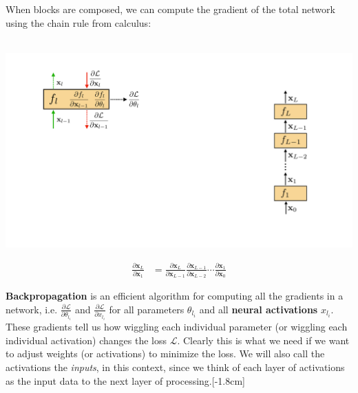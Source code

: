 When blocks are composed, we can compute the gradient of the total network using the chain rule from calculus:\\
\\
  \hspace*{0.10\linewidth}\begin{minipage}{.10\textwidth}
    \centering
    \includegraphics[width=1.0\linewidth]{./figures/backpropagation/composed_modules.pdf}
    \label{backpropagation:composed_modules}
  \end{minipage}
  \begin{minipage}{0.80\textwidth}
    \begin{align}
        \frac{\partial \mathbf{x}_{L}}{\partial \mathbf{x}_{1}} &= \frac{\partial \mathbf{x}_{L}}{\partial \mathbf{x}_{L-1}}\frac{\partial \mathbf{x}_{L-1}}{\partial \mathbf{x}_{L-2}} \cdots \frac{\partial \mathbf{x}_{1}}{\partial \mathbf{x}_{0}}\label{backprop:chain_rule}%
    \end{align}
  \end{minipage}

{\bf Backpropagation} is an efficient algorithm for computing all the gradients in a network, i.e. $\frac{\partial \mathcal{L}}{\partial \theta_{l_i}}$ and $\frac{\partial \mathcal{L}}{\partial x_{l_i}}$ for all parameters $\theta_{l_i}$ and all {\bf neural activations} $x_{l_i}$. These gradients tell us how wiggling each individual parameter (or wiggling each individual activation) changes the loss $\mathcal{L}$. Clearly this is what we need if we want to adjust weights (or activations) to minimize the loss. We will also call the activations the \emph{inputs}, in this context, since we think of each layer of activations as the input data to the next layer of processing.[-1.8cm]


